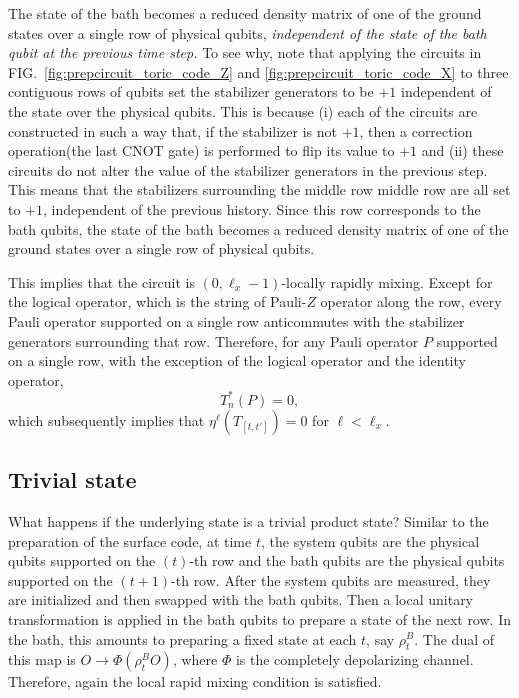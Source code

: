 \documentclass[prx,aps,amsmath,amssymb,floatfix,superscriptaddress,11pt,tightenlines,longbibliography,onecolumn,notitlepage]{revtex4-1}
\begin{document}
The state of the bath becomes a reduced density matrix of one of the ground states over a single row of physical qubits, \emph{independent of the state of the bath qubit at the previous time step.} To see why, note that applying the circuits in FIG.~\ref{fig:prepcircuit_toric_code_Z} and \ref{fig:prepcircuit_toric_code_X} to three contiguous rows of qubits set the stabilizer generators to be $+1$ independent of the state over the physical qubits. This is because (i) each of the circuits are constructed in such a way that, if the stabilizer is not $+1$, then a correction operation(the last CNOT gate) is performed to flip its value to $+1$ and (ii) these circuits do not alter the value of the stabilizer generators in the previous step. This means that the stabilizers surrounding the middle row middle row are all set to $+1$, independent of the previous history. Since this row corresponds to the bath qubits, the state of the bath becomes a reduced density matrix of one of the ground states over a single row of physical qubits. 

This implies that the circuit is $(0,\ell_x-1)$-locally rapidly mixing. Except for the logical operator, which is the string of Pauli-$Z$ operator along the row, every Pauli operator supported on a single row anticommutes with the stabilizer generators surrounding that row. Therefore, for any Pauli operator $P$ supported on a single row, with the exception of the logical operator and the identity operator,
\begin{equation}
T_n^*(P) = 0,
\end{equation}
which subsequently implies that $\eta^{\ell}(T_{[t,t']})=0$ for $\ell<\ell_x$.




\subsection{Trivial state}
What happens if the underlying state is a trivial product state? Similar to the preparation of the surface code, at time $t$, the system qubits are the physical qubits supported on the $(t)$-th row and the bath qubits are the physical qubits supported on the $(t+1)$-th row. After the system qubits are measured, they are initialized and then swapped with the bath qubits. Then a local unitary transformation is applied in the bath qubits to prepare a state of the next row. In the bath, this amounts to preparing a fixed state at each $t$, say $\rho^B_t$. The dual of this map is $O \to \Phi(\rho^B_t O)$, where $\Phi$ is the completely depolarizing channel. Therefore, again the local rapid mixing condition is satisfied. 
\end{document}
